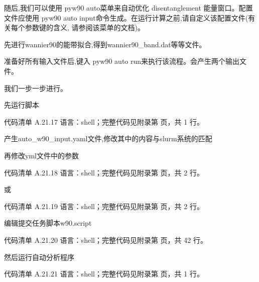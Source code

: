 \documentclass[lang=cn,scheme=chinese,color=blue,device=normal,toc=onecol,math=cm]{elegantbook}
\begin{document}
随后,我们可以使用 pyw90 auto菜单来自动优化 disentanglement 能量窗口。配置文件应使用 pyw90 auto input命令生成。在运行计算之前,请自定义该配置文件(有关每个参数键的含义, 请参阅该菜单的文档)。\par


先进行wannier90的能带拟合,得到wannier90\_\allowbreak{}band.dat等等文件。\par


准备好所有输入文件后,键入 pyw90 auto run来执行该流程。会产生两个输出文件。\par


我们一步一步进行。\par


先运行脚本\par


\begin{codeindexbox}{代码清单 A.21.17}
语言：shell；完整代码见附录第 \pageref{code:21:17} 页，共 1 行。
\end{codeindexbox}


产生auto\_\allowbreak{}w90\_\allowbreak{}input.yaml文件,修改其中的内容与slurm系统的匹配\par


再修改yml文件中的参数\par


\begin{codeindexbox}{代码清单 A.21.18}
语言：shell；完整代码见附录第 \pageref{code:21:18} 页，共 2 行。
\end{codeindexbox}


或\par


\begin{codeindexbox}{代码清单 A.21.19}
语言：shell；完整代码见附录第 \pageref{code:21:19} 页，共 2 行。
\end{codeindexbox}


编辑提交任务脚本w90.script\par


\begin{codeindexbox}{代码清单 A.21.20}
语言：shell；完整代码见附录第 \pageref{code:21:20} 页，共 42 行。
\end{codeindexbox}


然后运行自动分析程序\par


\begin{codeindexbox}{代码清单 A.21.21}
语言：shell；完整代码见附录第 \pageref{code:21:21} 页，共 1 行。
\end{codeindexbox}
\end{document}
